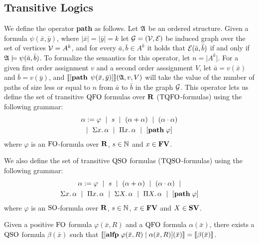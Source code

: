 
\subsection{Transitive Logics}

We define the operator {\bf path} as follows. Let $\mathfrak{A}$ be an ordered structure. Given a formula $\psi(\bar{x},\bar{y})$, where $\vert \bar{x} \vert = \vert \bar{y} \vert = k$ let ${\cal G} = ({\cal V},\cal{E})$ be induced graph over the set of vertices ${\cal V} = A^k$, and for every $\bar{a},\bar{b}\in A^k$ it holds that ${\cal E}(\bar{a},\bar{b})$ if and only if $\mathfrak{A} \models \psi(\bar{a},\bar{b})$. To formalize the semantics for this operator, let $n = \vert A^k \vert$.
For a given first order assignment $v$ and a second order asssignment $V$, let $\bar{a} = v(\bar{x})$ and $\bar{b} = v(\bar{y})$, and ${\llbracket{}{[{\bf path} \; \, \psi(\bar{x},\bar{y})]}\rrbracket}(\mathfrak{A},v,V)$ will take the value of the number of paths of size less or equal to $n$ from $\bar{a}$ to $\bar{b}$ in the graph ${\cal G}$. This operator lets us define the set of transitive ${\rm QFO}$ formulas over $\mathbf{R}$ (${\rm TQFO}$-formulas) using the following grammar:
\begin{multline*} 
	\alpha := \varphi \ \mid \ s \ \mid \ (\alpha + \alpha) \ \mid\ (\alpha \cdot \alpha) \\ \mid \ \Sigma{x}.\, \alpha \ \mid \ \Pi{x}.\, \alpha \ \mid \ [{\bf path} \; \varphi]
\end{multline*}
where $\varphi$ is an ${\rm FO}$-formula over $\mathbf{R}$, $s \in \mathbb{N}$ and $x \in \mathbf{FV}$.

We also define the set of transitive ${\rm QSO}$ formulas (${\rm TQSO}$-formulas) using the following grammar:
\begin{multline*}
	\alpha := \varphi \ \mid \ s \ \mid \ (\alpha + \alpha) \ \mid\ (\alpha \cdot \alpha) \ \mid \\ \Sigma{x}.\, \alpha \ \mid \ \Pi{x}.\, \alpha \ \mid \ \Sigma{X}.\, \alpha \ \mid \ \Pi{X}.\, \alpha \ \mid \ [{\bf path} \; \varphi]
\end{multline*}
where $\varphi$ is an ${\rm SO}$-formula over $\mathbf{R}$, $s \in \mathbb{N}$, $x \in \mathbf{FV}$ and $X \in \mathbf{SV}$.
\begin{theorem} \label{so-rec}
	Given a positive ${\rm FO}$ formula $\varphi(\bar{x},R)$ and a ${\rm QFO}$ formula $\alpha(\bar{x})$, there exists a ${\rm QSO}$ formula $\beta(\bar{x})$ such that ${\llbracket{}{[{\bf alfp} \; \varphi(\bar{x},R)\mid \alpha(\bar{x},R)](\bar{x})}\rrbracket} = {\llbracket{}{\beta(\bar{x})}\rrbracket}$.
\end{theorem}

